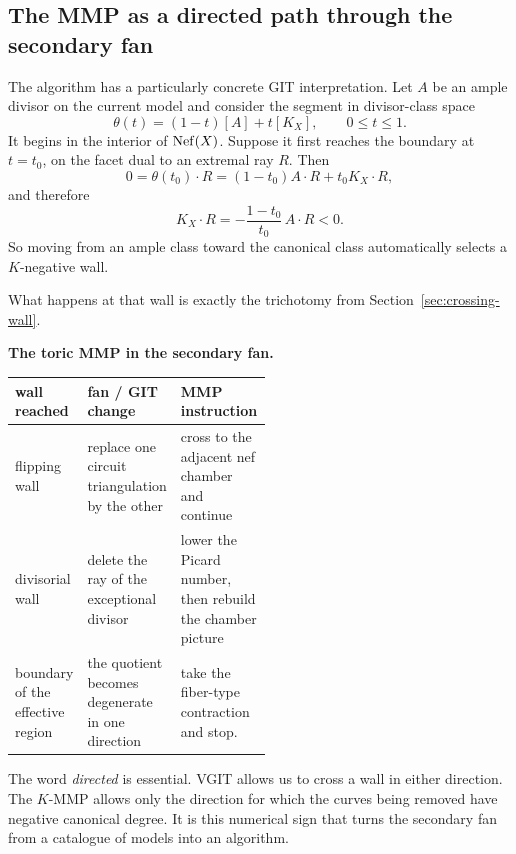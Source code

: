 \subsection{The MMP as a directed path through the secondary fan}

The algorithm has a particularly concrete GIT interpretation.  Let
\(A\) be an ample divisor on the current model and consider the segment
in divisor-class space
\[
\theta(t)=(1-t)[A]+t[K_X],
\qquad 0\leq t\leq1.
\]
It begins in the interior of \(\operatorname{Nef}(X)\).  Suppose it first reaches the
boundary at \(t=t_0\), on the facet dual to an extremal ray \(R\).  Then
\[
0=\theta(t_0)\cdot R
=(1-t_0)A\cdot R+t_0K_X\cdot R,
\]
and therefore
\[
\boxed{
K_X\cdot R
=
-\frac{1-t_0}{t_0}\,A\cdot R<0.}
\]
So moving from an ample class toward the canonical class automatically
selects a \(K\)-negative wall.

What happens at that wall is exactly the trichotomy from
Section~\ref{sec:crossing-wall}.

\begin{agcheatsheet}
\textbf{The toric MMP in the secondary fan.}

\medskip

\begin{center}
\small
\begin{tabularx}{\linewidth}{@{}
  >{\raggedright\arraybackslash}p{0.23\linewidth}
  >{\raggedright\arraybackslash}p{0.28\linewidth}
  >{\raggedright\arraybackslash}X@{}}
\toprule
\textbf{wall reached}
&\textbf{fan / GIT change}
&\textbf{MMP instruction}
\\
\midrule
flipping wall
&replace one circuit triangulation by the other
&cross to the adjacent nef chamber and continue
\\
divisorial wall
&delete the ray of the exceptional divisor
&lower the Picard number, then rebuild the chamber picture
\\
boundary of the effective region
&the quotient becomes degenerate in one direction
&take the fiber-type contraction and stop.
\\
\bottomrule
\end{tabularx}
\end{center}
\end{agcheatsheet}

The word \emph{directed} is essential.  VGIT allows us to cross a wall
in either direction.  The \(K\)-MMP allows only the direction for which
the curves being removed have negative canonical degree.  It is this
numerical sign that turns the secondary fan from a catalogue of models
into an algorithm.

